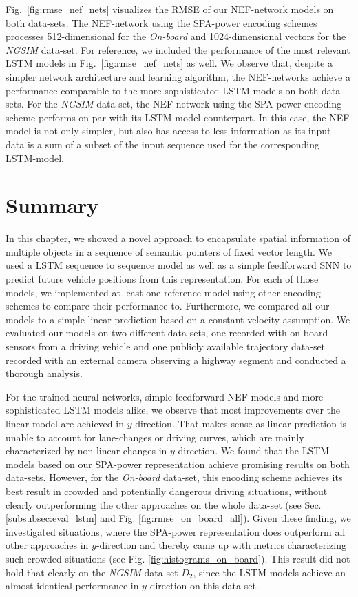 Fig.~\ref{fig:rmse_nef_nets} visualizes the \ac{RMSE} of our \ac{NEF}-network models on both data-sets.
The \ac{NEF}-network using the \ac{SPA}-power encoding schemes processes \num{512}-dimensional  for the \emph{On-board} and \num{1024}-dimensional vectors for the \emph{\ac{NGSIM}} data-set.
For reference, we included the performance of the most relevant \ac{LSTM} models in Fig.~\ref{fig:rmse_nef_nets} as well.
We observe that, despite a simpler network architecture and learning algorithm, the \ac{NEF}-networks achieve a performance comparable to the more sophisticated \ac{LSTM} models on both data-sets.
For the \emph{\ac{NGSIM}} data-set, the \ac{NEF}-network using the \ac{SPA}-power encoding scheme performs on par with its \ac{LSTM} model counterpart.
In this case, the \ac{NEF}-model is not only simpler, but also has access to less information as its input data is a sum of a subset of the input sequence used for the corresponding \ac{LSTM}-model.

\section{Summary}
\label{sec:behav_pred_summary}

In this chapter, we showed a novel approach to encapsulate spatial information of multiple objects in a sequence of semantic pointers of fixed vector length.
We used a \ac{LSTM} sequence to sequence model as well as a simple feedforward \acl{SNN} to predict future vehicle positions from this representation.
For each of those models, we implemented at least one reference model using other encoding schemes to compare their performance to.
Furthermore, we compared all our models to a simple linear prediction based on a constant velocity assumption.
We evaluated our models on two different data-sets, one recorded with on-board sensors from a driving vehicle and one publicly available trajectory data-set recorded with an external camera observing a highway segment and conducted a thorough analysis.

For the trained neural networks, simple feedforward \ac{NEF} models and more sophisticated \ac{LSTM} models alike, we observe that most improvements over the linear model are achieved in $y$-direction.
That makes sense as linear prediction is unable to account for lane-changes or driving curves, which are mainly characterized by non-linear changes in $y$-direction.
We found that the \ac{LSTM} models based on our \ac{SPA}-power representation achieve promising results on both data-sets.
However, for the \emph{On-board} data-set, this encoding scheme achieves its best result in crowded and potentially dangerous driving situations, without clearly outperforming the other approaches on the whole data-set (see Sec. \ref{subsubsec:eval_lstm} and Fig. \ref{fig:rmse_on_board_all}).
Given these finding, we investigated situations, where the \ac{SPA}-power representation does outperform all other approaches in $y$-direction and thereby came up with metrics characterizing such crowded situations (see Fig. \ref{fig:histograms_on_board}).
This result did not hold that clearly on the \emph{\ac{NGSIM}} data-set $D_2$, since the \ac{LSTM} models achieve an almost identical performance in $y$-direction on this data-set.

